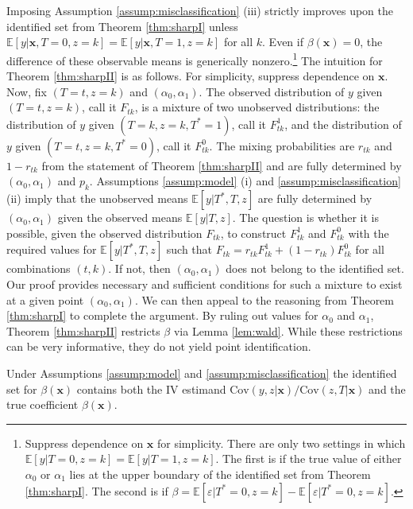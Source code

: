 Imposing Assumption \ref{assump:misclassification} (iii) strictly improves upon the identified set from Theorem \ref{thm:sharpI} unless $\mathbb{E}[y|\mathbf{x},T=0,z=k]=\mathbb{E}[y|\mathbf{x},T=1,z=k]$ for all $k$. 
Even if $\beta(\mathbf{x}) = 0$, the difference of these observable means is generically nonzero.\footnote{Suppress dependence on $\mathbf{x}$ for simplicity.
There are only two settings in which $\mathbb{E}[y|T=0,z=k] = \mathbb{E}[y|T=1,z=k]$.
The first is if the true value of either $\alpha_0$ or $\alpha_1$ lies at the upper boundary of the identified set from Theorem \ref{thm:sharpI}.
The second is if $\beta = \mathbb{E}[\varepsilon|T^*=0,z=k] - \mathbb{E}[\varepsilon|T^*=0,z=k]$.}
The intuition for Theorem \ref{thm:sharpII} is as follows.
For simplicity, suppress dependence on $\mathbf{x}$.
Now, fix $(T=t, z=k)$ and $(\alpha_0, \alpha_1)$.
The observed distribution of $y$ given $(T=t,z=k)$, call it $F_{tk}$, is a mixture of two unobserved distributions: the distribution of $y$ given $(T=k,z=k,T^*=1)$, call it $F^1_{tk}$, and the distribution of $y$ given $(T=t,z=k,T^*=0)$, call it $F^{0}_{tk}$.
The mixing probabilities are $r_{tk}$ and $1-r_{tk}$ from the statement of Theorem \ref{thm:sharpII} and are fully determined by $(\alpha_0, \alpha_1)$ and $p_k$.
Assumptions \ref{assump:model} (i) and \ref{assump:misclassification} (ii) imply that the unobserved means $\mathbb{E}[y|T^*,T,z]$  are fully determined by $(\alpha_0, \alpha_1)$ given the observed means $\mathbb{E}[y|T,z]$.
The question is whether it is possible, given the observed distribution $F_{tk}$, to construct $F^1_{tk}$ and $F^{0}_{tk}$ with the required values for $\mathbb{E}[y|T^*,T,z]$ such that $F_{tk} = r_{tk} F^{1}_{tk} + (1 - r_{tk}) F^{0}_{tk}$ for all combinations $(t,k)$. 
If not, then $(\alpha_0, \alpha_1)$ does not belong to the identified set.
Our proof provides necessary and sufficient conditions for such a mixture to exist at a given point $(\alpha_0, \alpha_1)$.
We can then appeal to the reasoning from Theorem \ref{thm:sharpI} to complete the argument.
By ruling out values for $\alpha_0$ and $\alpha_1$, Theorem \ref{thm:sharpII} restricts $\beta$ via Lemma \ref{lem:wald}. 
While these restrictions can be very informative,  they do not yield point identification.

\begin{cor}
  Under Assumptions \ref{assump:model} and \ref{assump:misclassification} the identified set for $\beta(\mathbf{x})$ contains both the IV estimand $\mbox{Cov}(y,z|\mathbf{x})/\mbox{Cov}(z,T|\mathbf{x})$ and the true coefficient $\beta(\mathbf{x})$.
  \label{cor:nonident}
\end{cor}

